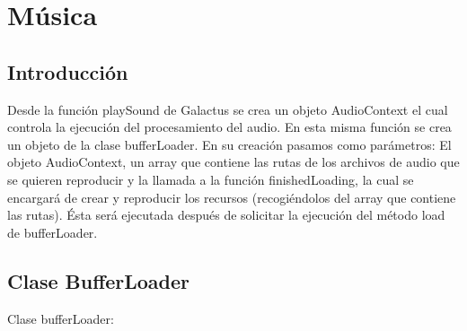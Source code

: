 \section{Música}
\label{sec:musica}

\subsection{Introducción}
\label{subsection:intro_musica}

Desde la función playSound de Galactus se crea un objeto AudioContext  el cual controla la ejecución del procesamiento del audio.
En esta misma función se crea un objeto de la clase bufferLoader. En su creación pasamos como parámetros: El objeto AudioContext, 
un array que contiene las rutas de los archivos de audio que se quieren reproducir y la llamada a la función  finishedLoading, la cual se 
encargará de crear y reproducir los recursos (recogiéndolos del array que contiene las rutas). Ésta será ejecutada después de solicitar la 
ejecución del método load de bufferLoader.

\subsection{Clase BufferLoader}
\label{subsection:buffer_loader}
Clase bufferLoader: 